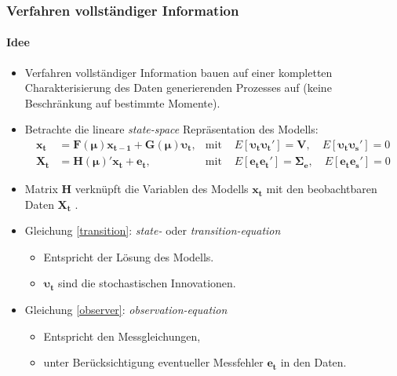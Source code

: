 \documentclass{beamer} %
\begin{document}
\begin{frame}\frametitle{Verfahren vollst\"{a}ndiger Information}\framesubtitle{Idee}
    \begin{itemize}
      \item Verfahren vollst\"{a}ndiger Information bauen auf einer kompletten Charakterisierung des Daten generierenden Prozesses auf (keine Beschr\"{a}nkung auf bestimmte Momente).
      \item Betrachte die lineare \emph{state-space} Repr\"{a}sentation des Modells:
        \begin{align}
        \mathbf{x_t} &= \mathbf{F}(\boldsymbol{\mu}) \mathbf{x_{t-1}} + \mathbf{G}(\boldsymbol{\mu}) \boldsymbol{\upsilon_{t}},  &\text{mit }&E[\boldsymbol{\upsilon_t} \boldsymbol{\upsilon_t}']=\mathbf{V},\quad E[\boldsymbol{\upsilon_t} \boldsymbol{\upsilon_s}']=0 \label{transition}\\
        \mathbf{X_t} &= \mathbf{H}(\boldsymbol{\mu})' \mathbf{x_t }+ \mathbf{e_t},& \text{mit }& E[\mathbf{e_t} \mathbf{e_t}']= \boldsymbol{\Sigma_e}, \quad E[\mathbf{e_t} \mathbf{e_s}']=0 \label{observer}
        \end{align}
    \item Matrix $\mathbf{H}$ verkn\"{u}pft die Variablen des Modells $\mathbf{x_t}$ mit den beobachtbaren Daten $\mathbf{X_t}$ .
    \item Gleichung \eqref{transition}: \emph{state-} oder \emph{transition-equation}
    \begin{itemize}
      \item Entspricht der L\"{o}sung des Modells.
      \item $\boldsymbol{\upsilon_t}$ sind die stochastischen Innovationen.
    \end{itemize}
    \item Gleichung \eqref{observer}: \emph{observation-equation}
    \begin{itemize}
      \item Entspricht den Messgleichungen,
      \item unter Berücksichtigung eventueller Messfehler $\mathbf{e_t}$ in den Daten.
    \end{itemize}
    \end{itemize}
\end{frame}
\end{document}
